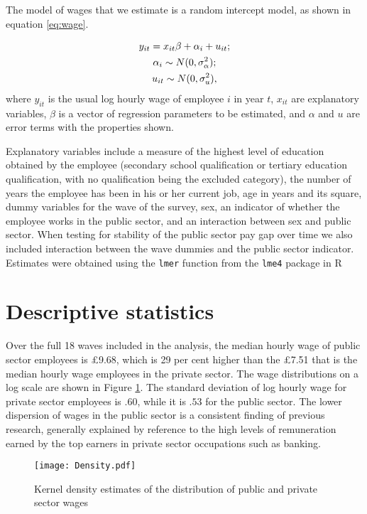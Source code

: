 \documentclass[a4paper,11pt,titlepage]{article}
\begin{document}
The model of wages that we estimate is a random intercept model, as shown in equation \eqref{eq:wage}.


\begin{gather}\label{eq:wage}
y_{it} = x_{it} \beta + \alpha_i + u_{it};\\
\alpha_i \sim N(0,\sigma_\alpha^2); \notag\\
u_{it} \sim N(0,\sigma_u^2),\notag
\end{gather}
where $y_{it}$ is the usual log hourly wage of employee $i$ in year $t$, $x_{it}$ are explanatory variables, $\beta$ is a vector of regression parameters to be estimated, and $\alpha$ and $u$ are error terms with the properties shown.

Explanatory variables include a measure of the highest level of education obtained by the employee (secondary school qualification or tertiary education qualification, with no qualification being the excluded category), the number of years the employee has been in his or her current job, age in years and its square, dummy variables for the wave of the survey, sex, an indicator of whether the employee works in the public sector, and an interaction between sex and public sector.  When testing for stability of the public sector pay gap over time we also included interaction between the wave dummies and the public sector indicator.  Estimates were obtained using the \texttt{lmer} function from the \texttt{lme4} package in R \citep{R2011,lme2011}

\section{Descriptive statistics}
Over the full 18 waves included in the analysis, the median hourly wage of public sector employees is \pounds 9.68, which is 29 per cent higher than the \pounds 7.51 that is the median hourly wage employees in the private sector.  The wage distributions on a log scale are shown in Figure \ref{fig:density}.  The standard deviation of log hourly wage for private sector employees is $.60$, while it is $.53$ for the public sector.  The lower dispersion of wages in the public sector is a consistent finding of previous research, generally explained by reference to the high levels of remuneration earned by the top earners in private sector occupations such as banking.

\begin{figure}[tb]
    \centering
    \texttt{[image: Density.pdf]}
    \caption{Kernel density estimates of the distribution of public and private sector wages\label{fig:density}}
\end{figure}
\end{document}
